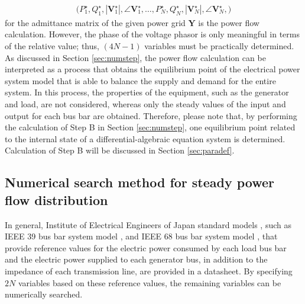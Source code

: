 \documentclass[tombow,dvipdfmx]{corona-a5-1.1}
\begin{document}
\begin{align}\label{eq:pfconst}
\bigl(
P_1^{\star},Q_1^{\star},|\bm{V}_1^{\star}|,\angle \bm{V}_1^{\star},
\ldots,
P_N^{\star},Q_N^{\star},|\bm{V}_N^{\star}|,\angle \bm{V}_N^{\star},
\bigr)
\end{align}
for the admittance matrix of the given power grid $\bm{Y}$ is the power flow calculation.
However, the phase of the voltage phasor is only meaningful in terms of the relative value; thus, $(4N-1)$ variables must be practically determined.
As discussed in Section \ref{sec:numstep}, the power flow calculation can be interpreted as a process that obtains the equilibrium point of the electrical power system model that is able to balance the supply and demand for the entire system.
In this process, the properties of the equipment, such as the generator and load, are not considered, whereas only the steady values of the input and output for each bus bar are obtained.
Therefore, please note that, by performing the calculation of Step B in Section \ref{sec:numstep}, one equilibrium point related to the internal state of a differential-algebraic equation system is determined.
Calculation of Step B will be discussed in Section \ref{sec:paradef}.


\subsection{Numerical search method for steady power flow distribution}


In general, Institute of Electrical Engineers of Japan standard models \cite{ieejstandardmodel}, such as IEEE 39 bus bar system model \cite{athay1979practical}, and IEEE 68 bus bar system model \cite{singh2013ieee},
that provide reference values for the electric power consumed by each load bus bar and the electric power supplied to each generator bus, in addition to the impedance of each transmission line, are provided in a datasheet.
By specifying $2N$ variables based on these reference values, the remaining variables can be numerically searched. 
\end{document}
